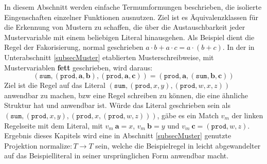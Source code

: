 \documentclass{scrartcl}
\numberwithin{figure}{section} %
\theoremstyle{definition} %
\begin{document}
In diesem Abschnitt werden einfache Termumformungen beschrieben, die isolierte Eingenschaften einzelner Funktionen ausnutzen. Ziel ist es Äquivalenzklassen für die Erkennung von Mustern zu schaffen, die über die Austauschbarkeit jeder Mustervariable mit einem beliebigen Literal hinausgehen. Als Beispiel dient die Regel der Fakorisierung, normal geschrieben $a \cdot b + a \cdot c = a \cdot (b + c)$. In der in Unterabschnitt \ref{subsecMuster} etablierten Musterschreibweise, mit Mustervariablen \textbf{fett} geschrieben, wird daraus:
$$(\texttt{sum}, (\texttt{prod}, \mathbf a, \mathbf b), (\texttt{prod}, \mathbf a, \mathbf c)) = (\texttt{prod}, \mathbf a, (\texttt{sum}, \mathbf b, \mathbf c))$$
Ziel ist die Regel auf das Literal $(\texttt{sum}, (\texttt{prod}, x, y), (\texttt{prod}, w, x, z))$ anwendbar zu machen, bzw eine Regel schreiben zu können, die eine ähnliche Struktur hat und anwendbar ist. 
Würde das Literal geschrieben sein als $(\texttt{sum}, (\texttt{prod}, x, y), (\texttt{prod}, x, (\texttt{prod}, w, z)))$, gäbe es ein Match $v_m$ der linken Regelseite mit dem Literal, mit $v_m~\mathbf a = x$, $v_m~\mathbf b = y$ und $v_m~\mathbf c = (\texttt{prod}, w, z)$. Ergebnis dieses Kapitels wird eine in Abschnitt \ref{subsecMuster} genutzte Projektion ${\mathrm{normalize} \colon T \rightarrow T}$ sein, welche die Beispielregel in leicht abgewandelter auf das Beispielliteral in seiner ursprünglichen Form anwendbar macht.\\
\end{document}
